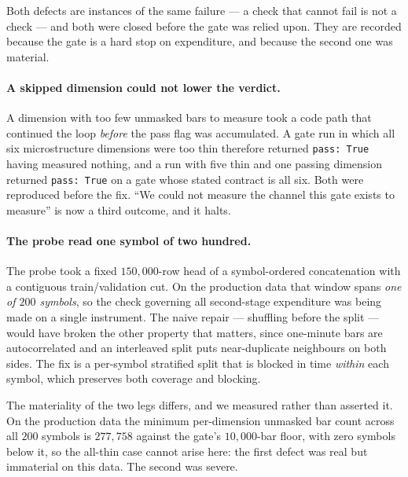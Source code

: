 Both defects are instances of the same failure --- a check that cannot fail is not a check --- and
both were closed before the gate was relied upon. They are recorded because the gate is a hard stop
on expenditure, and because the second one was material.

\paragraph{A skipped dimension could not lower the verdict.} A dimension with too few unmasked bars
to measure took a code path that continued the loop \emph{before} the pass flag was accumulated. A
gate run in which all six microstructure dimensions were too thin therefore returned
\texttt{pass: True} having measured nothing, and a run with five thin and one passing dimension
returned \texttt{pass: True} on a gate whose stated contract is all six. Both were reproduced before
the fix. ``We could not measure the channel this gate exists to measure'' is now a third outcome,
and it halts.

\paragraph{The probe read one symbol of two hundred.} The probe took a fixed $150{,}000$-row head of
a symbol-ordered concatenation with a contiguous train/validation cut. On the production data that
window spans \emph{one of $200$ symbols}, so the check governing all second-stage expenditure was
being made on a single instrument. The naive repair --- shuffling before the split --- would have
broken the other property that matters, since one-minute bars are autocorrelated and an interleaved
split puts near-duplicate neighbours on both sides. The fix is a per-symbol stratified split that is
blocked in time \emph{within} each symbol, which preserves both coverage and blocking.

The materiality of the two legs differs, and we measured rather than asserted it. On the production
data the minimum per-dimension unmasked bar count across all $200$ symbols is $277{,}758$ against
the gate's $10{,}000$-bar floor, with zero symbols below it, so the all-thin case cannot arise here:
the first defect was real but immaterial on this data. The second was severe.

